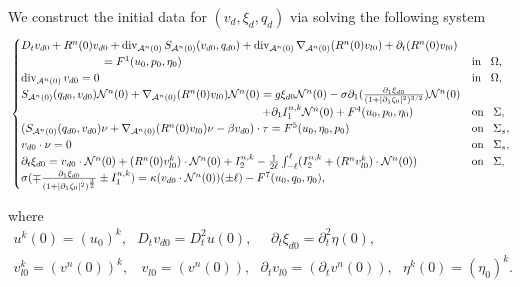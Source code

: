 \documentclass[letterpaper,reqno,10pt,twoside]{amsart}
\theoremstyle{definition}
\theoremstyle{remark}
\def\p{\partial}
\def\dive{\mathop{\rm div}\nolimits}
\begin{document}
\begin{appendix}
			We construct the initial data for $(v_{d},\xi_{d},q_{d})$ via solving the following system
			\begin{equation}{\label{initial_nk}}
				\begin{cases}
					D_{t}v_{d0}+R^{n}(0)v_{d0}+\operatorname{div}_{\mathcal{A}^{n}(0)}S_{\mathcal{A}^{n}(0)}(v_{d0},q_{d0})+\dive_{\mathcal{A}^{n}(0)}\nabla_{\mathcal{A}^{n}(0)}(R^{n}(0)v_{l0})+\p_{t}(R^{n}(0)v_{l0})\\
					\quad\quad\quad\quad\quad\quad\quad~ =F^{1}(u_{0},p_{0},\eta_{0})~~~&\operatorname{in}~~\Omega,\\
					\operatorname{div}_{\mathcal{A}^{n}(0)}v_{d0}=0~~~&\operatorname{in}~~\Omega,\\
					S_{\mathcal{A}^{n}(0)}(q_{d0},v_{d0})\mathcal{N}^{n}(0)+\nabla_{\mathcal{A}^{n}(0)}(R^{n}(0)v_{l0})\mathcal{N}^{n}(0)=g\xi_{d0}\mathcal{N}^{n}(0)-\sigma\partial_{1}(\frac{\p_1\xi_{d0}}{(1+\vert \partial_{1}\zeta_{0}\vert^{2})^{3/2}})\mathcal{N}^{n}(0)\\
					\quad\quad\quad\quad\quad\quad\quad~~~~~~~~~~~~~~~~~~~~~~~~~~~~~~~~~~~~~~~~~~~+\p_{1}I_{1}^{n,k}\mathcal{N}^{n}(0)+F^{4}(u_{0},p_{0},\eta_{0})~~~&\operatorname{on}~~\Sigma,\\
					(S_{\mathcal{A}^{n}(0)}(q_{d0},v_{d0})\nu+\nabla_{\mathcal{A}^{n}(0)}(R^{n}(0)v_{l0})\nu-\beta v_{d0})\cdot \tau=F^{5}(u_{0},\eta_{0},p_{0})~~~&\operatorname{on}~~\Sigma_{s},\\
					v_{d0}\cdot \nu=0~~~&\operatorname{on}~~\Sigma_{s},\\
					\partial_{t}\xi_{d0}=v_{d0}\cdot \mathcal{N}^{n}(0)+(R^{n}(0)v_{l0}^{k})\cdot \mathcal{N}^{n}(0)+I_{2}^{n,k}-\frac{1}{2\ell}\int_{-\ell}^{\ell}(I^{n,k}_{2}+(R^{n}v_{l0}^{k})\cdot \mathcal{N}^{n}(0))~~~&\operatorname{on}~~\Sigma,\\
					\sigma(\mp \frac{\partial_{1}\xi_{d0}}{(1+\vert \partial_{1}\zeta_{0}\vert^{2})^{\frac{3}{2}}}\pm I_{1}^{n,k})
					=\kappa (v_{d0}\cdot \mathcal{N}^{n}(0))(\pm \ell)-{F}^{7}(u_{0},q_{0},\eta_{0}),
				\end{cases}
			\end{equation}
			
			\noindent where
			\[
			\begin{aligned}
				u^{k}(0)=(u_{0})^{k},~~~D_{t}v_{d0}=D_{t}^{2}u(0),~~~~~~\p_{t}\xi_{d0}=\p_{t}^{2}\eta(0),\\
				v_{l0}^{k}=(v^{n}(0))^{k},~~~~v_{l0}=(v^{n}(0)),~~~\p_{t}v_{l0}=(\p_{t}v^{n}(0)),~~~\eta^{k}(0)=(\eta_{0})^{k}.
			\end{aligned}
			\]
			

\end{appendix}
\end{document}
